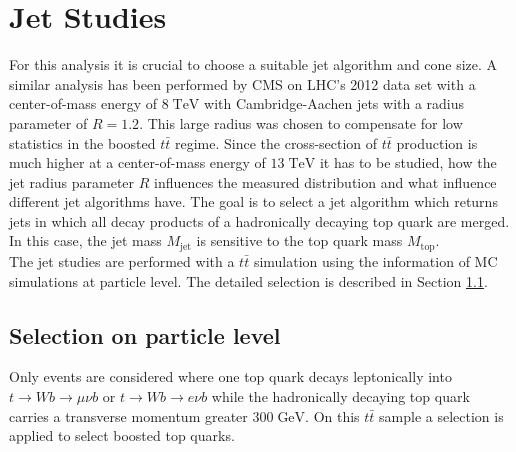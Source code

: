 	
\section{Jet Studies}
	For this analysis it is crucial to choose a suitable jet algorithm and cone size. A similar analysis has been performed by CMS on LHC's 2012 data set with a center-of-mass energy of $8\;\text{TeV}$ with Cambridge-Aachen jets with a radius parameter of $R=1.2$. This large radius was chosen to compensate for low statistics in the boosted $t\bar{t}$ regime. Since the cross-section of $t\bar{t}$ production is much higher at a center-of-mass energy of $13\;\text{TeV}$ it has to be studied, how the jet radius parameter $R$ influences the measured distribution and what influence different jet algorithms have. The goal is to select a jet algorithm which returns jets in which all decay products of a hadronically decaying top quark are merged. In this case, the jet mass $M_\text{jet}$ is sensitive to the top quark mass $M_\text{top}$.
	\\
	The jet studies are performed with a $t\bar{t}$ simulation using the information of MC simulations at particle level. The detailed selection is described in Section \ref{sec:GenSel}.

\subsection{Selection on particle level}
\label{sec:GenSel}
	Only events are considered where one top quark decays leptonically into $t\rightarrow Wb\rightarrow \mu \nu b$ or $t\rightarrow Wb\rightarrow e \nu b$ while the hadronically decaying top quark carries a transverse momentum greater $300\;\text{GeV}$. On this $t\bar{t}$ sample a selection is applied to select boosted top quarks.

